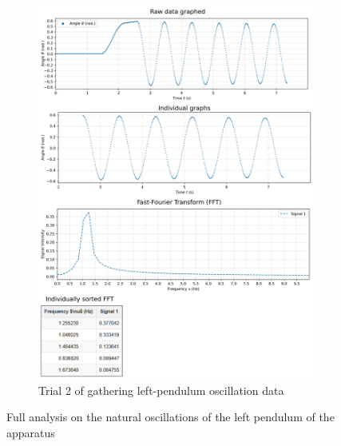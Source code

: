 \documentclass[12pt]{article}
\begin{document}
\begin{figure}[H]
\begin{subfigure}{0.49\linewidth}
        \includegraphics[width=0.98\linewidth]{figs/left pendulum trial 2.png}
        \caption{Trial 2 of gathering left-pendulum oscillation data}
    \end{subfigure}
    \caption{Full analysis on the natural oscillations of the left pendulum of the apparatus}
\end{figure}
\end{document}
